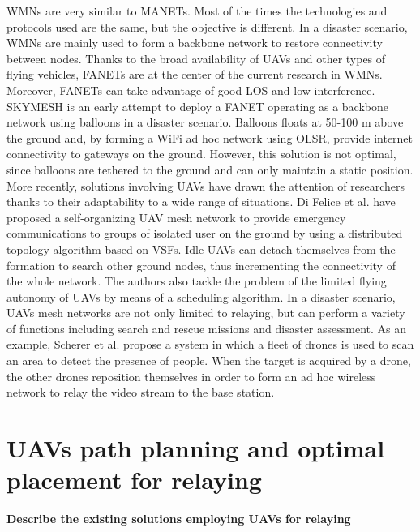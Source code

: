 \glspl{WMN} are very similar to \glspl{MANET}. Most of the times the technologies and protocols used are the same, but the objective is different. In a disaster scenario, \glspl{WMN} are mainly used to form a backbone network to restore connectivity between nodes. Thanks to the broad availability of \glspl{UAV} and other types of flying vehicles, \glspl{FANET} are at the center of the current research in \glspl{WMN}. Moreover, \glspl{FANET} can take advantage of good \gls{LOS} and low interference. SKYMESH \cite{ref:soa-fanet1} is an early attempt to deploy a \gls{FANET} operating as a backbone network using balloons in a disaster scenario. Balloons floats at 50-100 m above the ground and, by forming a WiFi ad hoc network using OLSR, provide internet connectivity to gateways on the ground. However, this solution is not optimal, since balloons are tethered to the ground and can only maintain a static position. More recently, solutions involving \glspl{UAV} have drawn the attention of researchers thanks to their adaptability to a wide range of situations. Di Felice et al. \cite{ref:soa-fanet2} have proposed a self-organizing \gls{UAV} mesh network to provide emergency communications to  groups of isolated user on the ground by using a distributed topology algorithm based on \glspl{VSF}. Idle \glspl{UAV} can detach themselves from the formation to search other ground nodes, thus incrementing the connectivity of the whole network. The authors also tackle the problem of the limited flying autonomy of \glspl{UAV} by means of a scheduling algorithm.   
In a disaster scenario, \glspl{UAV} mesh networks are not only limited to relaying, but can perform a variety of functions including search and rescue missions and disaster assessment. As an example, Scherer et al. \cite{ref:soa-fanet3} propose a system in which a fleet of drones is used to scan an area to detect the presence of people. When the target is acquired by a drone, the other drones reposition themselves in order to form an ad hoc wireless network to relay the video stream to the base station.

\section{UAVs path planning and optimal placement for relaying}

\textbf{Describe the existing solutions employing UAVs for relaying}
